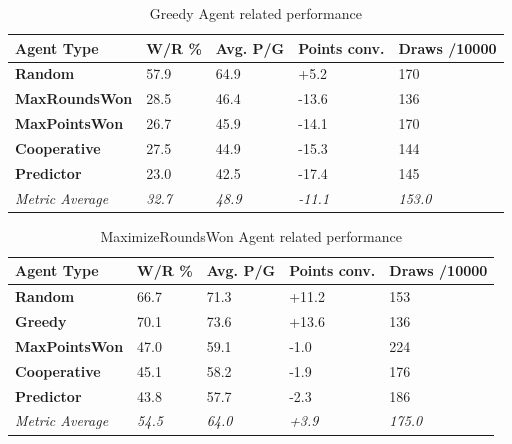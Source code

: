 \documentclass[sigconf]{acmart}
\begin{document}
\begin{table}[H]
  \fontsize{11}{13}\selectfont %
  \begin{tabular}{@{}p{2.9cm}p{1cm}p{1cm}p{1.2cm}p{1.2cm}@{}}
    \toprule
    Agent Type & \textbf{W/R \%} & \textbf{Avg. P/G} & \textbf{Points conv.} & \textbf{Draws /10000}\\
    \midrule
    \textbf{Random} & 57.9 & 64.9 & +5.2 & 170\\
    \textbf{MaxRoundsWon} & 28.5 & 46.4 & -13.6 & 136\\
    \textbf{MaxPointsWon} & 26.7 & 45.9 & -14.1 & 170\\
    \textbf{Cooperative} & 27.5 & 44.9 & -15.3 & 144\\
    \textbf{Predictor} & 23.0 & 42.5 & -17.4 & 145\\
    \midrule
    \textit{Metric Average} & \textit{32.7} & \textit{48.9} & \textit{-11.1} & \textit{153.0}\\
    \bottomrule
  \end{tabular}
  \vspace{2mm} %
  \caption{Greedy Agent related performance}
  \label{tab:greedy}
\end{table}

\begin{table}[H]
  \fontsize{11}{13}\selectfont %
  \begin{tabular}{@{}p{2.9cm}p{1cm}p{1cm}p{1.2cm}p{1.2cm}@{}}
    \toprule
    Agent Type & \textbf{W/R \%} & \textbf{Avg. P/G} & \textbf{Points conv.} & \textbf{Draws /10000}\\
    \midrule
    \textbf{Random} & 66.7 & 71.3 & +11.2 & 153\\
    \textbf{Greedy} & 70.1 & 73.6 & +13.6 & 136\\
    \textbf{MaxPointsWon} & 47.0 & 59.1 & -1.0 & 224\\
    \textbf{Cooperative} & 45.1 & 58.2 & -1.9 & 176\\
    \textbf{Predictor} & 43.8 & 57.7 & -2.3 & 186\\
    \midrule
    \textit{Metric Average} & \textit{54.5} & \textit{64.0} & \textit{+3.9} & \textit{175.0}\\
    \bottomrule
  \end{tabular}
  \vspace{2mm} %
  \caption{MaximizeRoundsWon Agent related performance}
  \label{tab:maxroundswon}
\end{table}
\end{document}
